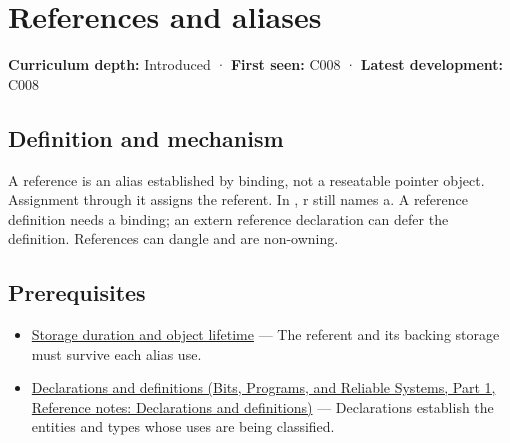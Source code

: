 \hypertarget{appendix-d6d562ca9fbb}{}\label{referencestart:appendix-d6d562ca9fbb}
\section{References and aliases}\label{appendix-d6d562ca9fbb-references-and-aliases}

\hypertarget{appendix-d6d562ca9fbb-references-and-aliases}{}

\textbf{Curriculum depth:} Introduced · \textbf{First seen:} C008 · \textbf{Latest development:} C008

\begin{allmightroledefinition}

\subsection{Definition and mechanism}\label{appendix-d6d562ca9fbb-definition-and-mechanism}

\hypertarget{appendix-d6d562ca9fbb-definition-and-mechanism}{}

A reference is an alias established by binding, not a reseatable pointer object. Assignment through it assigns the referent. In , r still names a. A reference definition needs a binding; an extern reference declaration can defer the definition. References can dangle and are non-owning.

\end{allmightroledefinition}

\subsection{Prerequisites}\label{appendix-d6d562ca9fbb-prerequisites}

\hypertarget{appendix-d6d562ca9fbb-prerequisites}{}

\begin{itemize}
\tightlist
\item
  \hyperref[appendix-0b104bcba06b]{Storage duration and object lifetime} --- The referent and its backing storage must survive each alias use.
\item
  \href{../01-Bits-Programs-and-Reliable-Systems-P01/main.pdf\#appendix-2e4d494c2d94}{Declarations and definitions (Bits, Programs, and Reliable Systems, Part 1, Reference notes: Declarations and definitions)} --- Declarations establish the entities and types whose uses are being classified.
\end{itemize}

